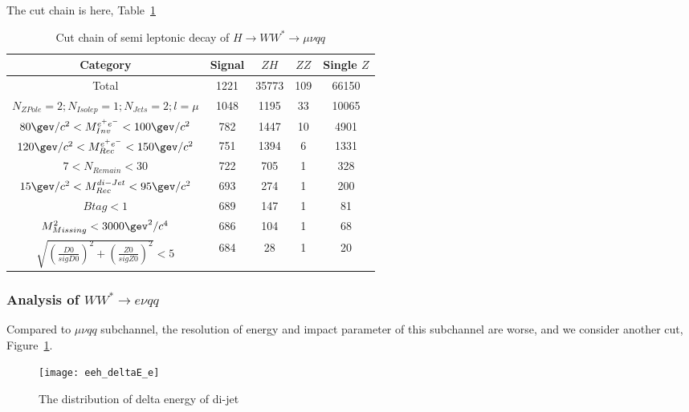\documentclass[11pt,a4paper]{cepcnote}
\begin{document}
The cut chain is here, Table~\ref{tab:semiuvqq}
\begin{table}[H]
  \begin{center}
    \begin{tabular}{ccccc}
      \hline \hline
      \multicolumn{1}{c}{Category}      & \multicolumn{1}{c}{Signal}&\multicolumn{1}{c}{$ZH$}&\multicolumn{1}{c}{$ZZ$}&\multicolumn{1}{c}{Single $Z$}\\ 
      \hline
      Total 	      	 									&   1221	& 35773	&	109	& 66150\\
      $N_{ZPole}=2; N_{Isolep}=1; N_{Jets} =2; l = \mu$		&   1048	& 1195	&	33	& 10065\\
      $80\gev/c^2 < M_{Inv}^{e^+e^-} < 100\gev/c^2$    		&   782		& 1447	&	10	& 4901\\
	  $120\gev/c^2 < M_{Rec}^{e^+e^-} < 150\gev/c^2$   		&   751 	& 1394	&	6	& 1331\\
	  $7 < N_{Remain} < 30$									&	722		& 705	& 	1	& 328\\
	  $15\gev/c^2 < M_{Rec}^{di-Jet} < 95\gev/c^2 $			&	693		& 274	&	1	& 200\\
	  $Btag < 1$											&	689		& 147	& 	1	& 81\\
	  $M_{Missing}^2 < 3000\gev^2/c^4$						&   686		& 104	&	1	& 68\\
	  $\sqrt{(\frac{D0}{sigD0})^2+(\frac{Z0}{sigZ0})^2} < 5$&	684  	&  28 	&	1	& 20\\
      \hline \hline
    \end{tabular}
  \caption[Monte Carlo purities in the single lepton sample]{%
    Cut chain of semi leptonic decay of $H\rightarrow WW^* \rightarrow \mu\nu qq$}
  \label{tab:semiuvqq}
  \end{center}
\end{table}

\subsubsection{Analysis of $WW^*\rightarrow e\nu qq$}
Compared to $\mu\nu qq$ subchannel, the resolution of energy and impact parameter of this subchannel are worse,
and we consider another cut, Figure~\ref{fig:semideltaE}.
\begin{figure}[H]
\centering
\texttt{[image: eeh\_deltaE\_e]}
\caption[]{The distribution of delta energy of di-jet}
\label{fig:semideltaE}
\end{figure}
\end{document}
